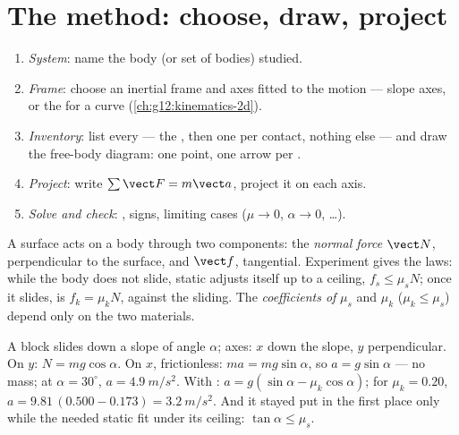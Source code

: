 \section{The method: choose, draw, project}

\begin{method}\label{met:g12:newtons-laws:method}
\begin{enumerate}
  \item \emph{System}: name the body (or set of bodies) studied.
  \item \emph{Frame}: choose an inertial frame and axes fitted to the motion ---
        slope axes, or the  for a curve (\cref{ch:g12:kinematics-2d}).
  \item \emph{Inventory}: list every  --- the , then one  per
        contact, nothing else --- and draw the free-body diagram: one point, one
        arrow per .
  \item \emph{Project}: write $\sum \vect F = m\vect a$, project it on each axis.
  \item \emph{Solve and check}: , signs, limiting cases ($\mu \to 0$,
        $\alpha \to 0$, \dots).
\end{enumerate}
\end{method}

\begin{definition}\label{def:g12:newtons-laws:friction}
A surface acts on a body through two components: the \emph{normal force} $\vect N$, perpendicular to the surface, and  $\vect f$, tangential.
Experiment gives the  laws: while the body does not slide, static 
adjusts itself up to a ceiling, $f_s \leq \mu_s N$; once it slides, 
is $f_k = \mu_k N$, against the sliding. The \emph{coefficients of }%
 $\mu_s$ and $\mu_k$ ($\mu_k \leq \mu_s$) depend only
on the two materials.
\end{definition}

\begin{example}\label{ex:g12:newtons-laws:incline}
A block slides down a slope of angle $\alpha$; axes: $x$ down the slope, $y$
perpendicular. On $y$: $N = mg\cos\alpha$. On $x$, frictionless: $ma = mg\sin\alpha$,
so $a = g\sin\alpha$ --- no mass; at $\alpha = 30^\circ$, $a = \qty{4.9}{m/s^2}$.
With : $a = g(\sin\alpha - \mu_k\cos\alpha)$; for $\mu_k = 0.20$,
$a = 9.81\,(0.500 - 0.173) = \qty{3.2}{m/s^2}$. And it stayed put in the first place
only while the needed static  fit under its ceiling: $\tan\alpha \leq \mu_s$.
\end{example}

